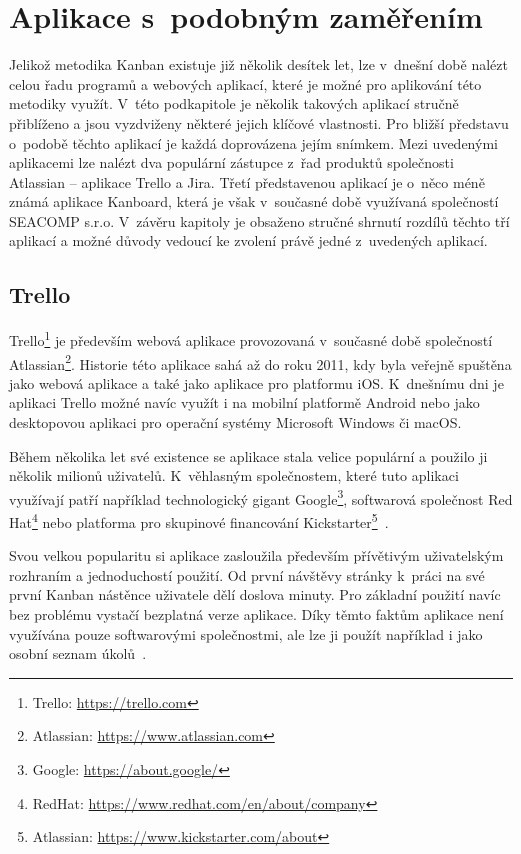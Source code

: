 \section{Aplikace s~podobným zaměřením}\label{sec:apps}
Jelikož metodika Kanban existuje již několik desítek let, lze v~dnešní době nalézt celou řadu programů a webových aplikací, které je možné pro aplikování této metodiky využít. V~této podkapitole je několik takových aplikací stručně přiblíženo a jsou vyzdviženy některé jejich klíčové vlastnosti. Pro bližší představu o~podobě těchto aplikací je každá doprovázena jejím snímkem. Mezi uvedenými aplikacemi lze nalézt dva populární zástupce z~řad produktů společnosti Atlassian -- aplikace Trello a Jira. Třetí představenou aplikací je o~něco méně známá aplikace Kanboard, která je však v~současné době využívaná společností SEACOMP s.r.o. V~závěru kapitoly je obsaženo stručné shrnutí rozdílů těchto tří aplikací a možné důvody vedoucí ke zvolení právě jedné z~uvedených aplikací.

\subsection{Trello}
Trello\footnote{Trello: \url{https://trello.com}} je především webová aplikace provozovaná v~současné době společností Atlassian\footnote{Atlassian: \url{https://www.atlassian.com}}. Historie této aplikace sahá až do roku 2011, kdy byla veřejně spuštěna jako webová aplikace a také jako aplikace pro platformu iOS. K~dnešnímu dni je aplikaci Trello možné navíc využít i na mobilní platformě Android nebo jako desktopovou aplikaci pro operační systémy Microsoft Windows či macOS. 

Během několika let své existence se aplikace stala velice populární a použilo ji několik milionů uživatelů. K~věhlasným společnostem, které tuto aplikaci využívají patří například technologický gigant Google\footnote{Google: \url{https://about.google/}}, softwarová společnost Red Hat\footnote{RedHat: \url{https://www.redhat.com/en/about/company}} nebo platforma pro skupinové financování Kickstarter\footnote{Atlassian: \url{https://www.kickstarter.com/about}}~\cite{bib:trello-about}. 

Svou velkou popularitu si aplikace zasloužila především přívětivým uživatelským rozhraním a jednoduchostí použití. Od první návštěvy stránky k~práci na své první Kanban nástěnce uživatele dělí doslova minuty. Pro základní použití navíc bez problému vystačí bezplatná verze aplikace. Díky těmto faktům aplikace není využívána pouze softwarovými společnostmi, ale lze ji použít například i jako osobní seznam úkolů~\cite{bib:jira-vs-trello}.

